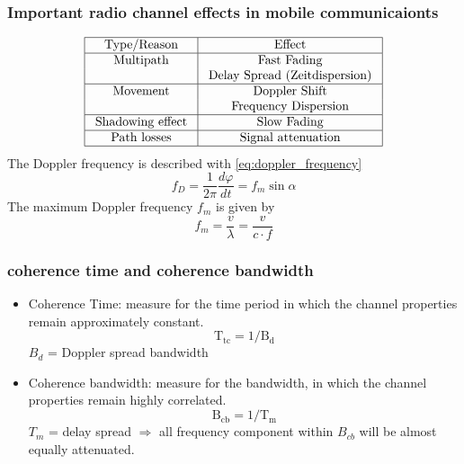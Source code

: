 \subsubsection{Important radio channel effects in mobile communicaionts}
$$
\begin{array}{|c|c|}
\hline \text { Type/Reason } & \text { Effect } \\
\hline \text { Multipath } & \text { Fast Fading } \\
& \text { Delay Spread (Zeitdispersion) } \\
\hline \text { Movement } & \text { Doppler Shift } \\
& \text { Frequency Dispersion } \\
\hline \text { Shadowing effect } & \text { Slow Fading } \\
\hline \text { Path losses } & \text { Signal attenuation } \\
\hline
\end{array}
$$
The Doppler frequency is described with \autoref{eq:doppler_frequency}
\begin{equation}\label{eq:doppler_frequency}
f_D=\frac{1}{2 \pi} \frac{d \varphi}{d t}=f_m \sin \alpha
\end{equation}
The maximum Doppler frequency $f_m$ is given by 
\begin{equation}
f_m=\frac{v}{\lambda}=\frac{v}{c \cdot f}
\end{equation}

\subsubsection{coherence time and coherence bandwidth}
\begin{itemize}
    \item Coherence Time: measure for the time period in which the channel properties remain approximately constant.
    \begin{equation}\label{eq:corherence_time}
    \mathrm{T}_{\mathrm{tc}}=1 / \mathrm{B_d}
    \end{equation}
    $B_d$ = Doppler spread bandwidth
    \item Coherence bandwidth: measure for the bandwidth, in which the channel properties remain highly correlated.
    \begin{equation}\label{eq:coherence_bandwidth}
    \mathrm{B}_{\mathrm{cb}}=1 / \mathrm{T_m}
    \end{equation}
    $T_m$ = delay spread \newline
    $\Rightarrow$ all frequency component within $B_{cb}$ will be almost equally attenuated.
\end{itemize}

